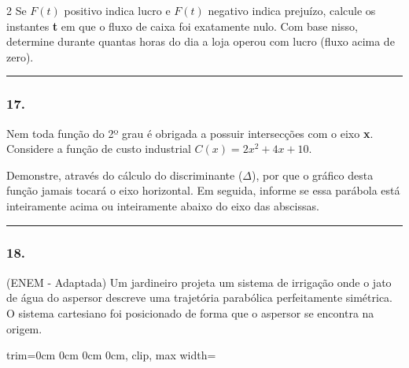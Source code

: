 \documentclass[twoside, 10pt, a4paper]{article}
\newlength{\espacoPreQuestao}
\newlength{\espacoQuestao}
\newlength{\larguraTikz}
\begin{document}
\begin{multicols*}{2}
Se $F(t)$ positivo indica lucro e $F(t)$ negativo indica prejuízo, calcule os instantes \textbf{t} em que o fluxo de caixa foi exatamente nulo. Com base nisso, determine durante quantas horas do dia a loja operou com lucro (fluxo acima de zero).
\par\vspace{\espacoQuestao}

\noindent\textcolor{CorLinha}{\rule{\linewidth}{0.5pt}} 
\par\vspace{\espacoPreQuestao}
\subsubsection*{17.} Nem toda função do 2º grau é obrigada a possuir intersecções com o eixo \textbf{x}. Considere a função de custo industrial $C(x) = 2x^2 + 4x + 10$.

Demonstre, através do cálculo do discriminante ($\Delta$), por que o gráfico desta função jamais tocará o eixo horizontal. Em seguida, informe se essa parábola está inteiramente acima ou inteiramente abaixo do eixo das abscissas.
\par\vspace{\espacoQuestao}

\noindent\textcolor{CorLinha}{\rule{\linewidth}{0.5pt}} 
\par\vspace{\espacoPreQuestao}
\subsubsection*{18.} (ENEM - Adaptada) Um jardineiro projeta um sistema de irrigação onde o jato de água do aspersor descreve uma trajetória parabólica perfeitamente simétrica. O sistema cartesiano foi posicionado de forma que o aspersor se encontra na origem.

\begin{center}
\begin{adjustbox}{trim=0cm 0cm 0cm 0cm, clip, max width=\larguraTikz}
\end{adjustbox}
\end{center}
\end{multicols*}
\end{document}
